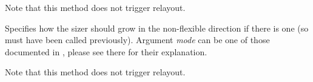 Note that this method does not trigger relayout.


\label{wxflexgridsizersetnonflexiblegrowmode}


Specifies how the sizer should grow in the non-flexible direction if
there is one (so
 must have
been called previously). Argument {\it mode} can be one of those documented in
, please
see there for their explanation.

Note that this method does not trigger relayout.

